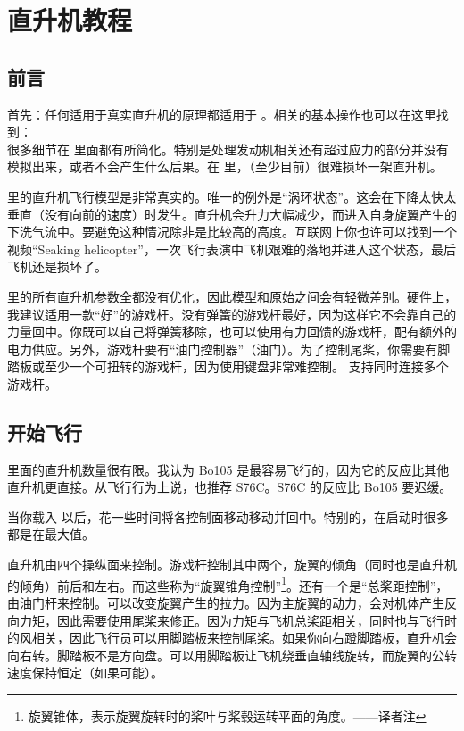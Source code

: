 \chapter{直升机教程}
\label{helicopter}

\section{前言}

首先：任何适用于真实直升机的原理都适用于 \FlightGear。相关的基本操作也可以在这里找到：\\ 很多细节在 \FlightGear 里面都有所简化。特别是处理发动机相关还有超过应力的部分并没有模拟出来，或者不会产生什么后果。在 \FlightGear 里，（至少目前）很难损坏一架直升机。


\FlightGear 里的直升机飞行模型是非常真实的。唯一的例外是“涡环状态”。这会在下降太快太垂直（没有向前的速度）时发生。直升机会升力大幅减少，而进入自身旋翼产生的下洗气流中。要避免这种情况除非是比较高的高度。互联网上你也许可以找到一个视频“Seaking helicopter”，一次飞行表演中飞机艰难的落地并进入这个状态，最后飞机还是损坏了。

\FlightGear 里的所有直升机参数全都没有优化，因此模型和原始之间会有轻微差别。硬件上，我建议适用一款“好”的游戏杆。没有弹簧的游戏杆最好，因为这样它不会靠自己的力量回中。你既可以自己将弹簧移除，也可以使用有力回馈的游戏杆，配有额外的电力供应。另外，游戏杆要有“油门控制器”（油门）。为了控制尾桨，你需要有脚踏板或至少一个可扭转的游戏杆，因为使用键盘非常难控制。\FlightGear{} 支持同时连接多个游戏杆。

\section{开始飞行}

\FlightGear{} 里面的直升机数量很有限。我认为 Bo105 是最容易飞行的，因为它的反应比其他直升机更直接。从飞行行为上说，也推荐 S76C。S76C 的反应比 Bo105 要迟缓。

当你载入 \FlightGear 以后，花一些时间将各控制面移动移动并回中。特别的，在启动时很多都是在最大值。


直升机由四个操纵面来控制。游戏杆控制其中两个，旋翼的倾角（同时也是直升机的倾角）前后和左右。而这些称为“旋翼锥角控制”\footnote{旋翼锥体，表示旋翼旋转时的桨叶与桨毂运转平面的角度。——译者注}。还有一个是“总桨距控制”，由油门杆来控制。可以改变旋翼产生的拉力。因为主旋翼的动力，会对机体产生反向力矩，因此需要使用尾桨来修正。因为力矩与飞机总桨距相关，同时也与飞行时的风相关，因此飞行员可以用脚踏板来控制尾桨。如果你向右蹬脚踏板，直升机会向右转。脚踏板不是方向盘。可以用脚踏板让飞机绕垂直轴线旋转，而旋翼的公转速度保持恒定（如果可能）。

